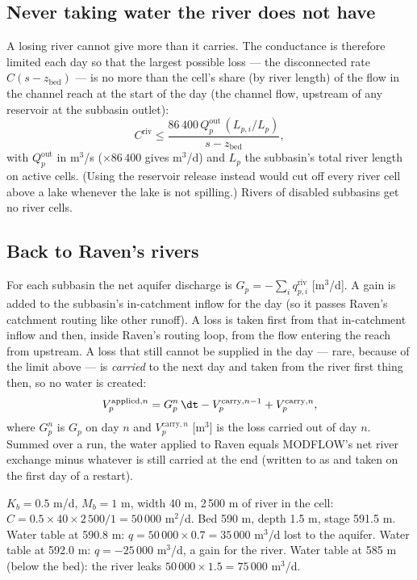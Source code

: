 \subsection{Never taking water the river does not have}
A losing river cannot give more than it carries. The conductance is therefore limited each day so that the largest
possible loss --- the disconnected rate $C(s-z_{\mathrm{bed}})$ --- is no more than the cell's share (by river length) of
the flow in the channel reach at the start of the day (the channel flow, upstream of any reservoir at the subbasin outlet):
\begin{equation}
C^{\mathrm{riv}}\le\frac{86\,400\,Q^{\mathrm{out}}_p\,(L_{p,i}/L_p)}{s-z_{\mathrm{bed}}},
\end{equation}
with $Q^{\mathrm{out}}_p$ in m$^3$/s ($\times86\,400$ gives m$^3$/d) and $L_p$ the subbasin's total river length on active cells. (Using the reservoir
release instead would cut off every river cell above a lake whenever the lake is not spilling.) Rivers of disabled
subbasins get no river cells.

\subsection{Back to Raven's rivers}
For each subbasin the net aquifer discharge is $G_p=-\sum_i q^{\mathrm{riv}}_{p,i}$ [m$^3$/d]. A gain is added to the
subbasin's in-catchment inflow for the day (so it passes Raven's catchment routing like other runoff). A loss is taken
first from that in-catchment inflow and then, inside Raven's routing loop, from the flow entering the reach from
upstream. A loss that still cannot be supplied in the day --- rare, because of the limit above --- is \emph{carried} to the
next day and taken from the river first thing then, so no water is created:
\begin{equation}
V^{\mathrm{applied},n}_p=G^n_p\,\dt-V^{\mathrm{carry},n-1}_p+V^{\mathrm{carry},n}_p,
\end{equation}
where $G^n_p$ is $G_p$ on day $n$ and $V^{\mathrm{carry},n}_p$ [m$^3$] is the loss carried out of day $n$. Summed over a run, the water applied to Raven equals MODFLOW's net
river exchange minus whatever is still carried at the end (written to  as  and
taken on the first day of a restart).
\begin{example}
$K_b=0.5$ m/d, $M_b=1$ m, width 40 m, 2\,500 m of river in the cell: $C=0.5\times40\times2\,500/1=50\,000$ m$^2$/d. Bed
590 m, depth 1.5 m, stage 591.5 m. Water table at 590.8 m: $q=50\,000\times0.7=35\,000$ m$^3$/d lost to the aquifer.
Water table at 592.0 m: $q=-25\,000$ m$^3$/d, a gain for the river. Water table at 585 m (below the bed): the river
leaks $50\,000\times1.5=75\,000$ m$^3$/d.
\end{example}

